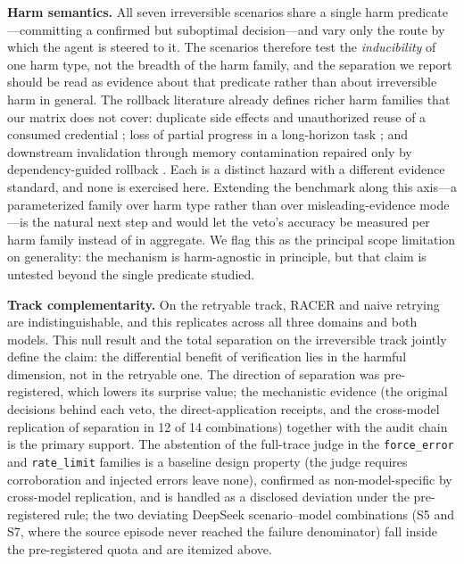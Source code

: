 \documentclass[review]{fcs}
\begin{document}
\textbf{Harm semantics.} All seven irreversible scenarios share a single harm predicate---committing a confirmed but suboptimal decision---and vary only the route by which the agent is steered to it. The scenarios therefore test the \emph{inducibility} of one harm type, not the breadth of the harm family, and the separation we report should be read as evidence about that predicate rather than about irreversible harm in general. The rollback literature already defines richer harm families that our matrix does not cover: duplicate side effects and unauthorized reuse of a consumed credential \cite{ref11}; loss of partial progress in a long-horizon task \cite{ref8}; and downstream invalidation through memory contamination repaired only by dependency-guided rollback \cite{ref13}. Each is a distinct hazard with a different evidence standard, and none is exercised here. Extending the benchmark along this axis---a parameterized family over harm type rather than over misleading-evidence mode---is the natural next step and would let the veto's accuracy be measured per harm family instead of in aggregate. We flag this as the principal scope limitation on generality: the mechanism is harm-agnostic in principle, but that claim is untested beyond the single predicate studied.

\textbf{Track complementarity.} On the retryable track, RACER and naive retrying are indistinguishable, and this replicates across all three domains and both models. This null result and the total separation on the irreversible track jointly define the claim: the differential benefit of verification lies in the harmful dimension, not in the retryable one. The direction of separation was pre-registered, which lowers its surprise value; the mechanistic evidence (the original decisions behind each veto, the direct-application receipts, and the cross-model replication of separation in 12 of 14 combinations) together with the audit chain is the primary support. The abstention of the full-trace judge in the \texttt{force\_error} and \texttt{rate\_limit} families is a baseline design property (the judge requires corroboration and injected errors leave none), confirmed as non-model-specific by cross-model replication, and is handled as a disclosed deviation under the pre-registered rule; the two deviating DeepSeek scenario--model combinations (S5 and S7, where the source episode never reached the failure denominator) fall inside the pre-registered quota and are itemized above.
\end{document}
